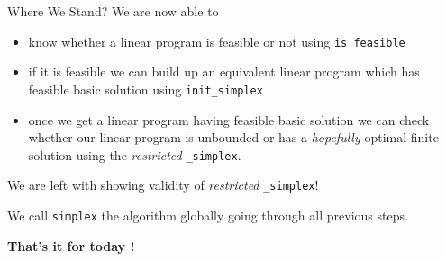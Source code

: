 \documentclass[32pt, aspectratio = 169]{beamer}
\begin{document}
\begin{frame}{Where We Stand?}
  We are now able to
  \begin{itemize}
  \item<1->
    know whether a linear program is feasible or not using
    \texttt{is_feasible}
  \item<2->
    if it is feasible we can build up an equivalent linear program
    which has feasible basic solution using
    \texttt{init_simplex}
  \item<3->
    once we get a linear program having feasible basic solution we can
    check whether our linear program is unbounded or has a
    \textit{hopefully} optimal finite solution using the
    \textit{restricted} \texttt{_simplex}.
  \end{itemize}
  \pause[4]
  We are left with showing validity of \textit{restricted}
  \texttt{_simplex}!
  \begin{tcolorbox}[
    enhanced,
    parbox = false,
    colback = mLightBrown!30!white,
    colframe = mLightBrown!30!white,
    arc = 0mm,
    ]
    We call \texttt{simplex} the algorithm globally going
    through all previous steps.
  \end{tcolorbox}
\end{frame}

\begin{frame}
  \centering
  {\huge \textbf{That's it for today !}}
\end{frame}
\end{document}
